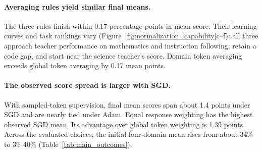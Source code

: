 \paragraph{Averaging rules yield similar final means.}
The three rules finish within 0.17 percentage points in mean score. Their learning curves and task rankings vary (Figure~\ref{fig:normalization_capability}c--f): all three approach teacher performance on mathematics and instruction following, retain a code gap, and start near the science teacher's score. Domain token averaging exceeds global token averaging by 0.17 mean points.


\paragraph{The observed score spread is larger with SGD.}
With sampled-token supervision, final mean scores span about 1.4 points under SGD and are nearly tied under Adam. Equal response weighting has the highest observed SGD mean. Its advantage over global token weighting is 1.39 points. Across the evaluated choices, the initial four-domain mean rises from about 34\% to 39--40\% (Table~\ref{tab:main_outcomes}).

\FloatBarrier
